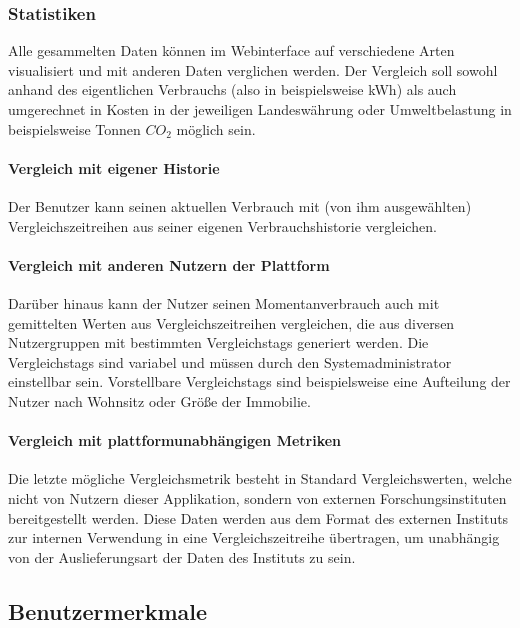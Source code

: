 \subsubsection{Statistiken}

Alle gesammelten Daten können im Webinterface auf verschiedene Arten visualisiert
und mit anderen Daten verglichen werden.
Der Vergleich soll sowohl anhand des eigentlichen Verbrauchs (also in beispielsweise kWh)
als auch umgerechnet in Kosten in der jeweiligen Landeswährung oder Umweltbelastung in beispielsweise Tonnen $CO_2$
möglich sein.

\paragraph{Vergleich mit eigener Historie}

Der Benutzer kann seinen aktuellen Verbrauch mit (von ihm ausgewählten) Vergleichszeitreihen aus seiner
eigenen Verbrauchshistorie vergleichen.


\paragraph{Vergleich mit anderen Nutzern der Plattform}
Darüber hinaus kann der Nutzer seinen Momentanverbrauch auch mit gemittelten Werten aus Vergleichszeitreihen vergleichen,
die aus diversen Nutzergruppen mit bestimmten Vergleichstags generiert werden.
Die Vergleichstags sind variabel und müssen durch den Systemadministrator einstellbar sein.
Vorstellbare Vergleichstags sind beispielsweise eine Aufteilung der Nutzer nach Wohnsitz oder Größe der Immobilie.


\paragraph{Vergleich mit plattformunabhängigen Metriken}
\label{vgl_plattformunabhängig}

Die letzte mögliche Vergleichsmetrik besteht in Standard Vergleichswerten, welche nicht von Nutzern dieser Applikation,
sondern von externen Forschungsinstituten bereitgestellt werden.
Diese Daten werden aus dem Format des externen Instituts zur internen Verwendung in eine Vergleichszeitreihe übertragen,
um unabhängig von der Auslieferungsart der Daten des Instituts zu sein.

\subsection{Benutzermerkmale}\label{sec:desc_user}

